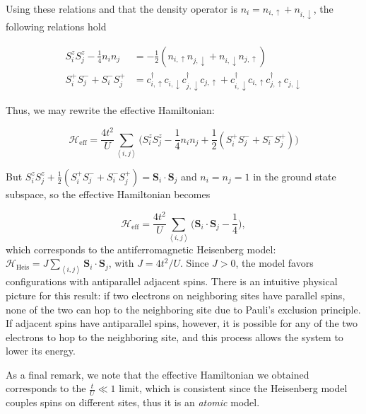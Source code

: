 Using these relations and that the density operator is $n_i = n_{i,\uparrow} + n_{i,\downarrow}$, the following relations hold

\begin{equation}
\begin{split}
S_i^z S_j^z - \frac{1}{4} n_i n_j &= -\frac{1}{2} ( n_{i,\uparrow} n_{j,\downarrow} + n_{i,\downarrow} n_{j,\uparrow} ) \\
S_i^+ S_j^- + S_i^- S_j^+ &= c_{i,\uparrow}^\dagger c_{i,\downarrow} c_{j,\downarrow}^\dagger  c_{j,\uparrow} +  c_{i,\downarrow}^\dagger c_{i,\uparrow} c_{j,\uparrow}^\dagger  c_{j,\downarrow}
\end{split}
\end{equation}

Thus, we may rewrite the effective Hamiltonian:

\begin{equation}
\mathcal{H}_{\text{eff}} = \frac{4t^2}{U} \sum_{\left\langle i, j \right\rangle} \bigg( S_i^z S_j^z - \frac{1}{4} n_i n_j + \frac{1}{2} ( S_i^+ S_j^- + S_i^- S_j^+ ) \bigg)
\end{equation}

But $S_i^z S_j^z + \frac{1}{2} ( S_i^+ S_j^- + S_i^- S_j^+) = \bm S_i \cdot \bm S_j$ and $n_i = n_j = 1$ in the ground state subspace, so the effective Hamiltonian becomes

\begin{equation}
\mathcal{H}_{\text{eff}} = \frac{4t^2}{U} \sum_{\left\langle i, j \right\rangle} \bigg( \bm S_i \cdot \bm S_j  - \frac{1}{4}  \bigg),
\end{equation}
which corresponds to the antiferromagnetic Heisenberg model: $\mathcal{H}_{\text{Heis}} = J \sum_{\left\langle i, j \right\rangle} \bm S_i \cdot \bm S_j $, with $J = 4 t^2 / U$. Since $J > 0$, the model favors configurations with antiparallel adjacent spins. There is an intuitive physical picture for this result: if two electrons on neighboring sites have parallel spins, none of the two can hop to the neighboring site due to Pauli's exclusion principle. If adjacent spins have antiparallel spins, however, it is possible for any of the two electrons to hop to the neighboring site, and this process allows the system to lower its energy.

As a final remark, we note that the effective Hamiltonian we obtained corresponds to the $\frac{t}{U} \ll 1$ limit, which is consistent since the Heisenberg model couples spins on different sites, thus it is an \emph{atomic} model.


